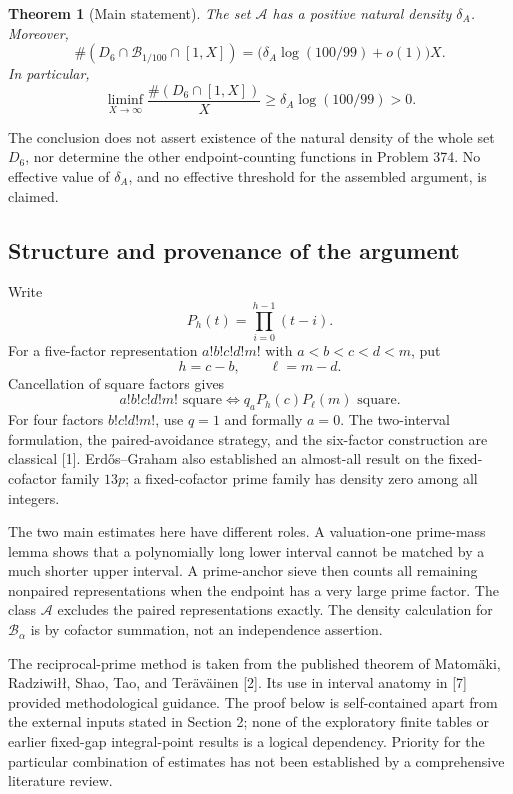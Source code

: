 \documentclass[letterpaper]{article}
\newtheorem{theorem}{Theorem}[section]
\theoremstyle{definition}
\theoremstyle{remark}
\numberwithin{equation}{section}
\begin{document}
\begin{theorem}[Main statement]
The set $\mathcal A$ has a positive natural density $\delta_A$. Moreover,
\begin{equation}
  \#(D_6\cap\mathcal B_{1/100}\cap[1,X])=\bigl(\delta_A\log(100/99)+o(1)\bigr)X.
\end{equation}
In particular,
\[
  \liminf_{X\to\infty}\frac{\#(D_6\cap[1,X])}{X}\ge\delta_A\log(100/99)>0.
\]
\end{theorem}

The conclusion does not assert existence of the natural density of the whole set $D_6$, nor
determine the other endpoint-counting functions in Problem 374. No effective value of $\delta_A$, and
no effective threshold for the assembled argument, is claimed.

\subsection{Structure and provenance of the argument}

Write
\[
  P_h(t)=\prod_{i=0}^{h-1}(t-i).
\]
For a five-factor representation $a!b!c!d!m!$ with $a<b<c<d<m$, put
\[
  h=c-b,\qquad \ell=m-d.
\]
Cancellation of square factors gives
\begin{equation}
  a!b!c!d!m! \text{ square}\iff q_aP_h(c)P_\ell(m)\text{ square.}
\end{equation}
For four factors $b!c!d!m!$, use $q=1$ and formally $a=0$. The two-interval formulation, the
paired-avoidance strategy, and the six-factor construction are classical [1]. Erd\H{o}s--Graham also
established an almost-all result on the fixed-cofactor family $13p$; a fixed-cofactor prime family
has density zero among all integers.

The two main estimates here have different roles. A valuation-one prime-mass lemma shows
that a polynomially long lower interval cannot be matched by a much shorter upper interval. A
prime-anchor sieve then counts all remaining nonpaired representations when the endpoint has
a very large prime factor. The class $\mathcal A$ excludes the paired representations exactly.
The density calculation for $\mathcal B_\alpha$ is by cofactor summation, not an independence assertion.

The reciprocal-prime method is taken from the published theorem of Matom\"aki, Radziwi\l\l,
Shao, Tao, and Ter\"av\"ainen [2]. Its use in interval anatomy in [7] provided methodological guidance.
The proof below is self-contained apart from the external inputs stated in Section 2; none of
the exploratory finite tables or earlier fixed-gap integral-point results is a logical dependency.
Priority for the particular combination of estimates has not been established by a comprehensive
literature review.
\end{document}
